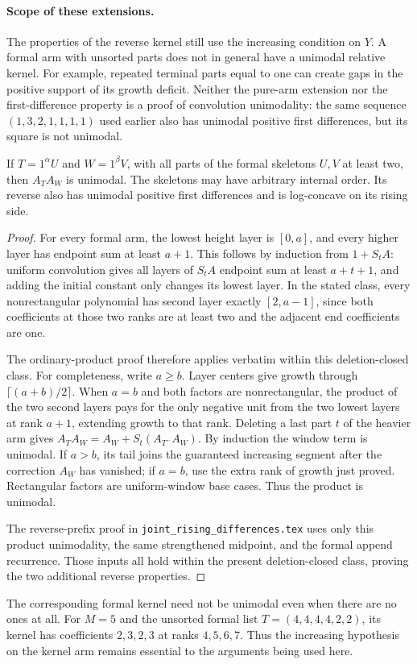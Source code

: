 \paragraph{Scope of these extensions.}
The properties of the reverse kernel still use the increasing
condition on $Y$. A formal arm with unsorted parts does not in
general have a unimodal relative kernel. For example, repeated
terminal parts equal to one can create gaps in the positive
support of its growth deficit. Neither the pure-arm extension
nor the first-difference property is a proof of convolution
unimodality: the same sequence $(1,3,2,1,1,1,1)$ used earlier
also has unimodal positive first differences, but its square
is not unimodal.

\begin{proposition}
If $T=1^\alpha U$ and $W=1^\beta V$, with all parts of the
formal skeletons $U,V$ at least two, then $A_TA_W$ is unimodal.
The skeletons may have arbitrary internal order. Its reverse
also has unimodal positive first differences and is log-concave
on its rising side.
\end{proposition}
\begin{proof}
For every formal arm, the lowest height layer is $[0,a]$,
and every higher layer has endpoint sum at least $a+1$.
This follows by induction from $1+S_tA$: uniform convolution
gives all layers of $S_tA$ endpoint sum at least $a+t+1$,
and adding the initial constant only changes its lowest layer.
In the stated class, every nonrectangular polynomial has second
layer exactly $[2,a-1]$, since both coefficients at those two
ranks are at least two and the adjacent end coefficients are one.

The ordinary-product proof therefore applies verbatim within
this deletion-closed class. For completeness, write $a\ge b$.
Layer centers give growth through $\lceil(a+b)/2\rceil$.
When $a=b$ and both factors are nonrectangular, the product of
the two second layers pays for the only negative unit from the
two lowest layers at rank $a+1$, extending growth to that rank.
Deleting a last part $t$ of the heavier arm gives
$A_TA_W=A_W+S_t(A_{T^-}A_W)$. By induction the window term
is unimodal. If $a>b$, its tail joins the guaranteed increasing
segment after the correction $A_W$ has vanished; if $a=b$,
use the extra rank of growth just proved. Rectangular factors
are uniform-window base cases. Thus the product is unimodal.

The reverse-prefix proof in \texttt{joint\_rising\_differences.tex}
uses only this product unimodality, the same strengthened midpoint,
and the formal append recurrence. Those inputs all hold within
the present deletion-closed class, proving the two additional
reverse properties.
\end{proof}

The corresponding formal kernel need not be unimodal even when
there are no ones at all. For $M=5$ and the unsorted formal list
$T=(4,4,4,4,2,2)$, its kernel has coefficients $2,3,2,3$ at
ranks $4,5,6,7$. Thus the increasing hypothesis on the kernel
arm remains essential to the arguments being used here.
